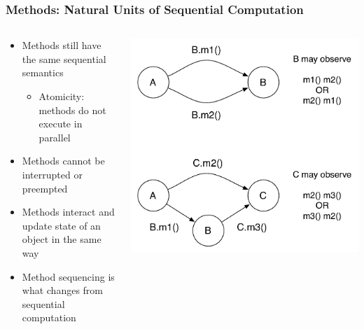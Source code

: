 \begin{frame}[fragile]
  \frametitle{Methods: Natural Units of Sequential Computation}
  \begin{columns}
    \begin{column}{0.55\textwidth}
      \begin{itemize}
      \item Methods still have the same sequential semantics
        \begin{itemize}
        \item Atomicity: methods do not execute in parallel
        \end{itemize}
      \item Methods cannot be interrupted  or preempted
      \item Methods interact and update state of an object in the same way
      \item Method sequencing is what changes from sequential computation
      \end{itemize}
    \end{column}
\pause
    \begin{column}{0.45\textwidth}
      \includegraphics[width=1\textwidth]{figures/sequencing.pdf}
    \end{column}
  \end{columns}
\end{frame}

